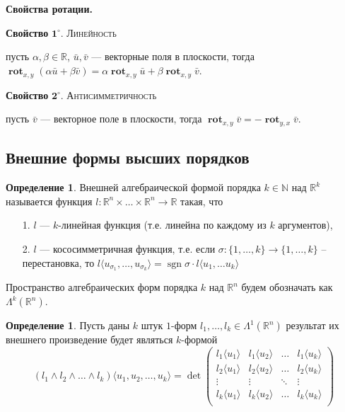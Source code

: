 \documentclass[a5paper]{article}
\newcounter{through}
\theoremstyle{plain}
\theoremstyle{definition}
\newtheorem{definition}[through]{Определение}
\numberwithin{through}{section}
\numberwithin{equation}{section}
\DeclareMathOperator{\sgn}{sgn}
\DeclareMathOperator{\rot}{\textbf{rot}}
\begin{document}
{\bf Свойства ротации.}

\medskip
{\bf Свойство} $\mathbf{1^\circ.}$
{\textsc{Линейность}}

 пусть $\alpha, \beta \in \mathbb{R}$, $\bar{u}, \bar{v}$ --- векторные поля в плоскости,
	тогда
	$\rot_{x, y} (\alpha\bar{u} + \beta\bar{v}) = \alpha\rot_{x,y} \bar{u} + \beta\rot_{x, y} \bar{v}$.
	
\medskip
{\bf Свойство} $\mathbf{2^\circ.}$
{\textsc{Антисимметричность}}

	пусть $\bar{v}$ --- векторное поле в плоскости,
	тогда $\rot_{x,y} \bar{v} = - \rot_{y, x} \bar{v}$.
	






\subsection{Внешние формы высших порядков}

\begin{definition}
	Внешней алгебраической формой порядка $k \in \mathbb{N}$ над $\mathbb{R}^k$ называется функция 
	$l : \mathbb{R}^n \times \ldots \times \mathbb{R}^n \to \mathbb{R}$ такая, что 
	\begin{itemize}
		\item[1.]
		$l$ --- $k$-линейная функция (т.е. линейна по каждому из $k$ аргументов),
		
		\item[2.]
		$l$ --- кососимметричная функция, т.е. если $\sigma: \{ 1,\ldots,k \} \to \{ 1,\ldots,k \}$ -- перестановка, то
		$l\langle u_{\sigma_1},\ldots, u_{\sigma_k} \rangle = \sgn \sigma\cdot l\langle u_1, \ldots u_k \rangle$
	\end{itemize}
\end{definition}


	Пространство алгебраических форм порядка $k$ над $\mathbb{R}^n$ будем обозначать как $\Lambda^k(\mathbb{R}^n)$.


\begin{definition}
	Пусть даны $k$ штук $1$-форм $l_1,\ldots,l_k \in \Lambda^1(\mathbb{R}^n)$ результат их внешнего произведение будет являться $k$-формой
	\begin{equation*}
		(l_1 \wedge l_2 \wedge \ldots \wedge l_k)\langle u_1, u_2,\ldots, u_k\rangle = \det 
		\begin{pmatrix}
		l_1\langle u_1 \rangle & l_1 \langle u_2 \rangle & \ldots &  l_1\langle u_k \rangle \\
		l_2\langle u_1 \rangle & l_2 \langle u_2 \rangle & \ldots &  l_2\langle u_k \rangle \\
		\vdots & \vdots & \ddots & \vdots \\ 
		l_k\langle u_1 \rangle & l_k \langle u_2 \rangle & \ldots &  l_k\langle u_k \rangle \\
		\end{pmatrix}
	\end{equation*}
\end{definition}
\end{document}
